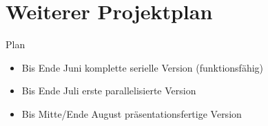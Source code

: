\section{Weiterer Projektplan}
\begin{frame}{Plan}
	\begin{itemize}
		\item Bis Ende Juni komplette serielle Version (funktionsfähig)
		\item Bis Ende Juli erste parallelisierte Version
		\item Bis Mitte/Ende August präsentationsfertige Version
	\end{itemize}
\end{frame}
